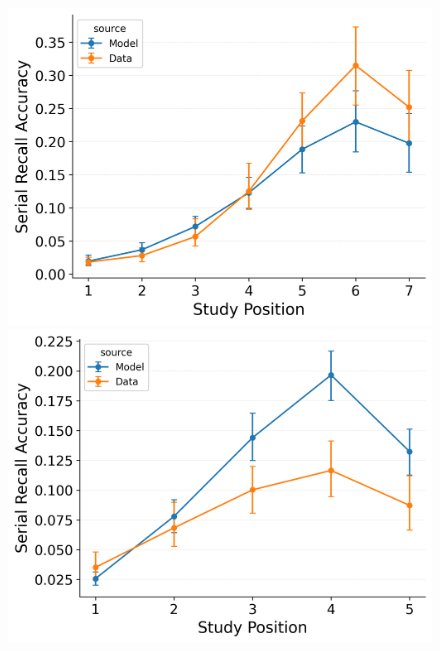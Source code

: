 \documentclass[
  man,
  floatsintext,
  longtable,
  nolmodern,
  notxfonts,
  notimes,
  draftfirst,
  colorlinks=true,linkcolor=blue,citecolor=blue,urlcolor=blue]{apa7}
\begin{document}
\begin{figure}
%
\begin{minipage}{0.33\linewidth}
\includegraphics{figures/Gordon2021_CRU_with_Pre-Expt_and_Primacy__and_ContextTerm_Confusable_Fitting_intrusion_error_rate_LL7.png}\end{minipage}%
\newline
\begin{minipage}{0.33\linewidth}
\includegraphics{figures/Gordon2021_CRU_with_Pre-Expt_and_Primacy__and_ContextTerm_Confusable_Fitting_order_error_rate_LL5.png}\end{minipage}%
%
\begin{minipage}{0.33\linewidth}

\end{minipage}
\end{figure}
\end{document}

